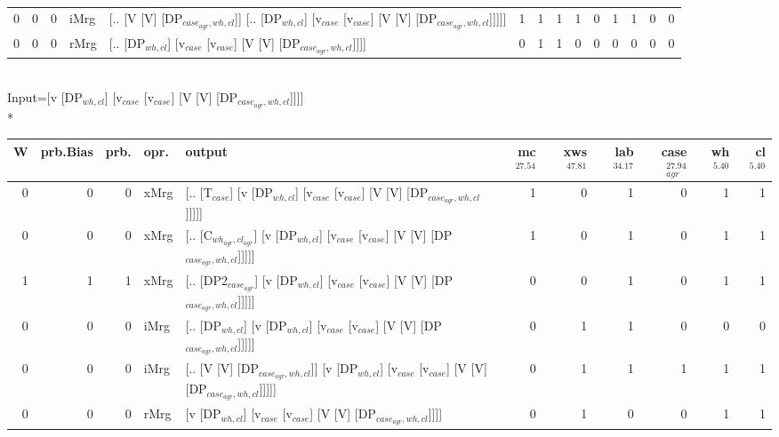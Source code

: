 \begin{tabularx}{\linewidth}{rrrlXrrrrrrrrr}
   0 &       0 &   0 & iMrg & [.. [V [V] [DP$_{case_{agr},wh,cl}$]] [.. [DP$_{wh,cl}$] [v$_{case}$ [v$_{case}$] [V [V] [DP$_{case_{agr},wh,cl}$]]]]]                   &            1 &             1 &             1 &                  1 &              0 &           1 &           1 &                0 &             0 \\
   0 &       0 &   0 & rMrg & [.. [DP$_{wh,cl}$] [v$_{case}$ [v$_{case}$] [V [V] [DP$_{case_{agr},wh,cl}$]]]]                                                    &            0 &             1 &             1 &                  0 &              0 &           0 &           0 &                0 &             0 \\
\hline
\end{tabularx}\endgroup\\
\begingroup\scriptsize Input=[v [DP$_{wh,cl}$] [v$_{case}$ [v$_{case}$] [V [V] [DP$_{case_{agr},wh,cl}$]]]]\\*
\begin{tabularx}{\linewidth}{rrrlXrrrrrr}
\hline
   W &   prb.Bias &   prb. & opr.   & output                                                                                        &   mc$^{27.54}$ &   xws$^{47.81}$ &   lab$^{34.17}$ &   case$_{agr}^{27.94}$ &   wh$^{5.40}$ &   cl$^{5.40}$ \\
\hline
   0 &       0 &   0 & xMrg & [.. [T$_{case}$] [v [DP$_{wh,cl}$] [v$_{case}$ [v$_{case}$] [V [V] [DP$_{case_{agr},wh,cl}$]]]]]                    &            1 &             0 &             1 &                  0 &           1 &           1 \\
   0 &       0 &   0 & xMrg & [.. [C$_{wh_{agr},cl_{agr}}$] [v [DP$_{wh,cl}$] [v$_{case}$ [v$_{case}$] [V [V] [DP$_{case_{agr},wh,cl}$]]]]]           &            1 &             0 &             1 &                  0 &           1 &           1 \\
   1 &       1 &   1 & xMrg & [.. [DP2$_{case_{agr}}$] [v [DP$_{wh,cl}$] [v$_{case}$ [v$_{case}$] [V [V] [DP$_{case_{agr},wh,cl}$]]]]]              &            0 &             0 &             1 &                  0 &           1 &           1 \\
   0 &       0 &   0 & iMrg & [.. [DP$_{wh,cl}$] [v [DP$_{wh,cl}$] [v$_{case}$ [v$_{case}$] [V [V] [DP$_{case_{agr},wh,cl}$]]]]]                  &            0 &             1 &             1 &                  0 &           0 &           0 \\
   0 &       0 &   0 & iMrg & [.. [V [V] [DP$_{case_{agr},wh,cl}$]] [v [DP$_{wh,cl}$] [v$_{case}$ [v$_{case}$] [V [V] [DP$_{case_{agr},wh,cl}$]]]]] &            0 &             1 &             1 &                  1 &           1 &           1 \\
   0 &       0 &   0 & rMrg & [v [DP$_{wh,cl}$] [v$_{case}$ [v$_{case}$] [V [V] [DP$_{case_{agr},wh,cl}$]]]]                                  &            0 &             1 &             0 &                  0 &           1 &           1 \\
\hline
\end{tabularx}\endgroup\\

